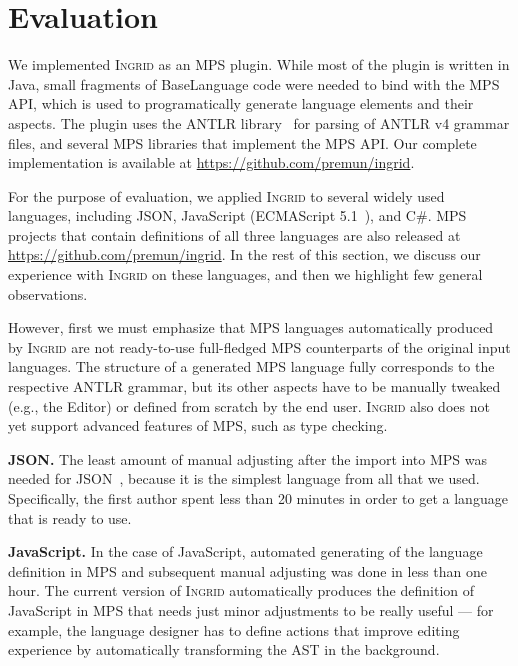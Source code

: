 \section{Evaluation}
\label{sect:EVAL}

We implemented \textsc{Ingrid} as an MPS plugin.
While most of the plugin is written in Java, small fragments of BaseLanguage code were needed to bind with the MPS API, which is used to programatically generate language elements and their aspects.
The plugin uses the ANTLR library~\cite{ref:ANTLR} for parsing of ANTLR v4 grammar files, and several MPS libraries that implement the MPS API.
Our complete implementation is available at \url{https://github.com/premun/ingrid}.

For the purpose of evaluation, we applied \textsc{Ingrid} to several widely used languages, including JSON, JavaScript (ECMAScript 5.1~\cite{ref:ECMASCRIPT51}), and C\#.
MPS projects that contain definitions of all three languages are also released at \url{https://github.com/premun/ingrid}.
In the rest of this section, we discuss our experience with \textsc{Ingrid} on these languages, and then we highlight few general observations.

However, first we must emphasize that MPS languages automatically produced by \textsc{Ingrid} are not ready-to-use full-fledged MPS counterparts of the original input languages.
The structure of a generated MPS language fully corresponds to the respective ANTLR grammar, but its other aspects have to be manually tweaked (e.g., the Editor) or defined from scratch by the end user.
\textsc{Ingrid} also does not yet support advanced features of MPS, such as type checking.

\noindent\textbf{JSON.}
The least amount of manual adjusting after the import into MPS was needed for JSON~\cite{ref:JSON}, because it is the simplest language from all that we used.
Specifically, the first author spent less than 20 minutes in order to get a language that is ready to use.

\noindent\textbf{JavaScript.}
In the case of JavaScript, automated generating of the language definition in MPS and subsequent manual adjusting was done in less than one hour.
The current version of \textsc{Ingrid} automatically produces the definition of JavaScript in MPS that needs just minor adjustments to be really useful --- for example, the language designer has to define actions that improve editing experience by automatically transforming the AST in the background.

